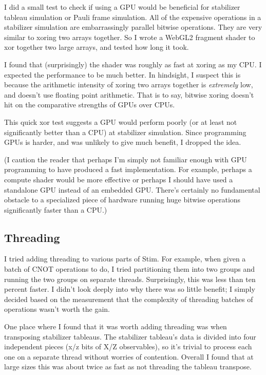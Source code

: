 \documentclass[onecolumn,unpublished]{quantumarticle}
\theoremstyle{definition}
\theoremstyle{definition}
\theoremstyle{definition}
\begin{document}
I did a small test to check if using a GPU would be beneficial for stabilizer tableau simulation or Pauli frame simulation.
All of the expensive operations in a stabilizer simulation are embarrassingly parallel bitwise operations.
They are very similar to xoring two arrays together.
So I wrote a WebGL2 fragment shader to xor together two large arrays, and tested how long it took.

I found that (surprisingly) the shader was roughly as fast at xoring as my CPU.
I expected the performance to be much better.
In hindsight, I suspect this is because the arithmetic intensity of xoring two arrays together is {\em extremely} low, and doesn't use floating point arithmetic.
That is to say, bitwise xoring doesn't hit on the comparative strengths of GPUs over CPUs.

This quick xor test suggests a GPU would perform poorly (or at least not significantly better than a CPU) at stabilizer simulation.
Since programming GPUs is harder, and was unlikely to give much benefit, I dropped the idea.

(I caution the reader that perhaps I'm simply not familiar enough with GPU programming to have produced a fast implementation.
For example, perhaps a compute shader would be more effective or perhaps I should have used a standalone GPU instead of an embedded GPU.
There's certainly no fundamental obstacle to a specialized piece of hardware running huge bitwise operations significantly faster than a CPU.)

\subsection{Threading}

I tried adding threading to various parts of Stim.
For example, when given a batch of CNOT operations to do, I tried partitioning them into two groups and running the two groups on separate threads.
Surprisingly, this was less than ten percent faster.
I didn't look deeply into why there was so little benefit; I simply decided based on the measurement that the complexity of threading batches of operations wasn't worth the gain.

One place where I found that it was worth adding threading was when transposing stabilizer tableaus.
The stabilizer tableau's data is divided into four independent pieces (x/z bits of X/Z observables), so it's trivial to process each one on a separate thread without worries of contention.
Overall I found that at large sizes this was about twice as fast as not threading the tableau transpose.
\end{document}

